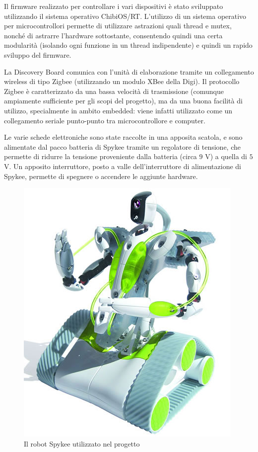 Il firmware realizzato per controllare i vari dispositivi è stato sviluppato utilizzando il sistema operativo ChibiOS/RT\cite{chibios}. L'utilizzo di un sistema operativo per microcontrollori permette di utilizzare astrazioni quali thread e mutex, nonché di astrarre l'hardware sottostante, consentendo quindi una certa modularità (isolando ogni funzione in un thread indipendente) e quindi un rapido sviluppo del firmware.

La Discovery Board comunica con l'unità di elaborazione tramite un collegamento wireless di tipo Zigbee (utilizzando un modulo XBee della Digi). Il protocollo Zigbee è caratterizzato da una bassa velocità di trasmissione (comunque ampiamente sufficiente per gli scopi del progetto), ma da una buona facilità di utilizzo, specialmente in ambito embedded: viene infatti utilizzato come un collegamento seriale punto-punto tra microcontrollore e computer.

Le varie schede elettroniche sono state raccolte in una apposita scatola, e sono alimentate dal pacco batteria di Spykee tramite un regolatore di tensione, che permette di ridurre la tensione proveniente dalla batteria (circa $9$ V) a quella di $5$ V. Un apposito interruttore, posto a valle dell'interruttore di alimentazione di Spykee, permette di spegnere o accendere le aggiunte hardware.

\begin{figure}[h]
\centering
\includegraphics[scale=0.4]{images/spykee}
\caption{Il robot Spykee utilizzato nel progetto}
\end{figure}

